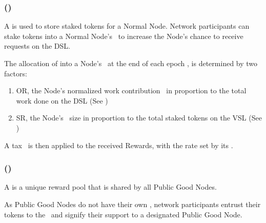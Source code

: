 \subsubsection{ (\stakingPool)}
\label{subsubsec:staking_pool}

A  is used to store staked tokens for a Normal Node. Network participants can stake tokens into a Normal Node's \stakingPool\ to increase the Node's chance to receive requests on the \gls{DSL}.

The allocation of  into a Node's \stakingPool\ at the end of each epoch \epoch, is determined by two factors:
\begin{enumerate}
    \item \gls{OR}, the Node's normalized work contribution \work\ in proportion to the total work done on the \gls{DSL} (See )
    \item \gls{SR}, the Node's \stakingPool\ size in proportion to the total staked tokens on the \gls{VSL} (See )
\end{enumerate}

A tax \tax\ is then applied to the received Rewards, with the rate set by its .

\subsubsection{ (\publicGoodPool)}

A  is a unique reward pool that is shared by all Public Good Nodes.

As Public Good Nodes do not have their own \stakingPool, network participants entrust their tokens to the \publicGoodPool\ and signify their support to a designated Public Good Node.
